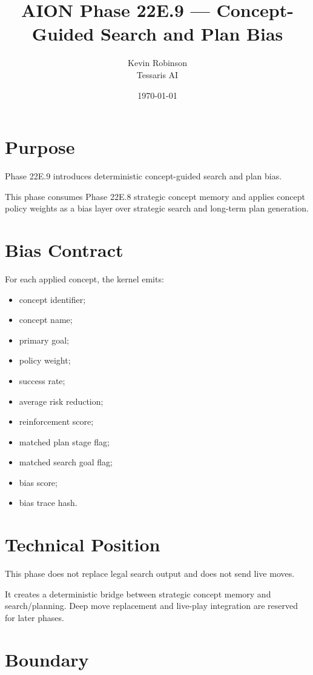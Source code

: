 \documentclass[11pt,a4paper]{article}
\title{\textbf{AION Phase 22E.9 --- Concept-Guided Search and Plan Bias}}
\author{Kevin Robinson\\Tessaris AI}
\date{\today}
\begin{document}
\maketitle

\section{Purpose}

Phase 22E.9 introduces deterministic concept-guided search and plan bias.

This phase consumes Phase 22E.8 strategic concept memory and applies concept policy weights as a bias layer over strategic search and long-term plan generation.

\section{Bias Contract}

For each applied concept, the kernel emits:

\begin{itemize}[leftmargin=*]
  \item concept identifier;
  \item concept name;
  \item primary goal;
  \item policy weight;
  \item success rate;
  \item average risk reduction;
  \item reinforcement score;
  \item matched plan stage flag;
  \item matched search goal flag;
  \item bias score;
  \item bias trace hash.
\end{itemize}

\section{Technical Position}

This phase does not replace legal search output and does not send live moves.

It creates a deterministic bridge between strategic concept memory and search/planning. Deep move replacement and live-play integration are reserved for later phases.

\section{Boundary}
\end{document}
